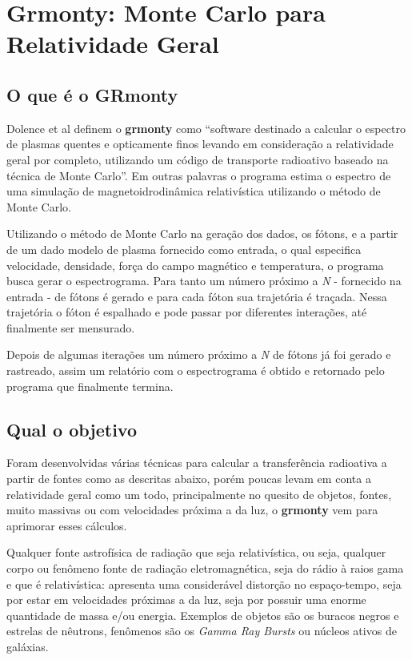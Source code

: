 \chapter{Grmonty: Monte Carlo para Relatividade Geral}
\label{cap:grmonty}

\section{O que é o GRmonty}
  Dolence et al definem o \textbf{grmonty} como ``software destinado a calcular o espectro de plasmas quentes e opticamente finos levando em consideração a relatividade geral por completo, utilizando um código de transporte radioativo baseado na técnica de Monte Carlo''\citep[p.1, traduzido]{Dolence:09}. Em outras palavras o programa estima o espectro de uma simulação de magnetoidrodinâmica \cite{eletro-hidro-dynamic} relativística utilizando o método de Monte Carlo.

  Utilizando o método de Monte Carlo na geração dos dados, os fótons, e a partir de um dado modelo de plasma fornecido como entrada, o qual especifica velocidade, densidade, força do campo magnético e temperatura, o programa busca gerar o espectrograma. Para tanto um número próximo a \textit{N} - fornecido na entrada - de fótons é gerado e para cada fóton sua trajetória é traçada. Nessa trajetória o fóton é espalhado e pode passar por diferentes interações, até finalmente ser mensurado.

  Depois de algumas iterações um número próximo a \textit{N} de fótons já foi gerado e rastreado, assim um relatório com o espectrograma é obtido e retornado pelo programa que finalmente termina.

\section{Qual o objetivo}
  Foram desenvolvidas várias técnicas para calcular a transferência radioativa a partir de fontes como as descritas abaixo\citep{Dolence:09}, porém poucas levam em conta a relatividade geral como um todo, principalmente no quesito de objetos, fontes, muito massivas ou com velocidades próxima a da luz, o \textbf{grmonty} vem para aprimorar esses cálculos.

  Qualquer fonte astrofísica de radiação que seja relativística, ou seja, qualquer corpo ou fenômeno fonte de radiação eletromagnética, seja do rádio à raios gama e que é relativística: apresenta uma considerável distorção no espaço-tempo, seja por estar em velocidades próximas a da luz, seja por possuir uma enorme quantidade de massa e/ou energia. Exemplos de objetos são os buracos negros e estrelas de nêutrons, fenômenos são os \textit{Gamma Ray Bursts} ou núcleos ativos de galáxias.


